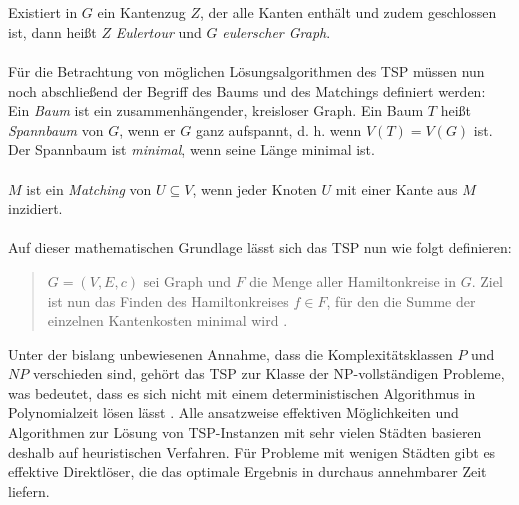 \documentclass[doktyp=barbeit, sprache=german]{TUBAFarbeiten}
\begin{document}
\\\\Existiert in $G$ ein Kantenzug $Z$, der alle Kanten enthält und zudem geschlossen ist, dann heißt $Z$ \textit{Eulertour} und $G$ \textit{eulerscher Graph}.
\\\\Für die Betrachtung von möglichen Lösungsalgorithmen des TSP müssen nun noch abschließend der Begriff des Baums und des Matchings definiert werden:
\\Ein \textit{Baum} ist ein zusammenhängender, kreisloser Graph. Ein Baum $T$ heißt \textit{Spannbaum} von $G$, wenn er $G$ ganz aufspannt, d. h. wenn $V(T) = V(G)$ ist. Der Spannbaum ist \textit{minimal}, wenn seine Länge minimal ist.
\\\\$M$ ist ein \textit{Matching} von $U \subseteq V$, wenn jeder Knoten $U$ mit einer Kante aus $M$ inzidiert.
\\\\Auf dieser mathematischen Grundlage lässt sich das TSP nun wie folgt definieren: 
\begin{quotation}
$G = (V,E,c)$ sei Graph und $F$ die Menge aller Hamiltonkreise in $G$. Ziel ist nun das Finden des Hamiltonkreises $f \in F$, für den die Summe der einzelnen Kantenkosten minimal wird \cite{TSPVariations}.
\end{quotation}
Unter der bislang unbewiesenen Annahme, dass die Komplexitätsklassen $P$ und $NP$ verschieden sind, gehört das TSP zur Klasse der NP-vollständigen Probleme, was bedeutet, dass es sich nicht mit einem deterministischen Algorithmus in Polynomialzeit lösen lässt \cite{Applegate2007}.  Alle ansatzweise effektiven Möglichkeiten und Algorithmen zur Lösung von TSP-Instanzen mit sehr vielen Städten basieren deshalb auf heuristischen Verfahren. Für Probleme mit wenigen Städten gibt es effektive Direktlöser, die das optimale Ergebnis in durchaus annehmbarer Zeit liefern.
\end{document}
